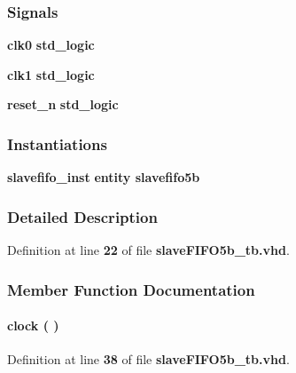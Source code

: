 \subsubsection*{Signals}
 \begin{DoxyCompactItemize}
\item 
{\bf clk0} {\bfseries \textcolor{comment}{std\+\_\+logic}\textcolor{vhdlchar}{ }} 
\item 
{\bf clk1} {\bfseries \textcolor{comment}{std\+\_\+logic}\textcolor{vhdlchar}{ }} 
\item 
{\bf reset\+\_\+n} {\bfseries \textcolor{comment}{std\+\_\+logic}\textcolor{vhdlchar}{ }} 
\end{DoxyCompactItemize}
\subsubsection*{Instantiations}
 \begin{DoxyCompactItemize}
\item 
{\bf slavefifo\+\_\+inst}  {\bfseries entity slavefifo5b}   
\end{DoxyCompactItemize}


\subsubsection{Detailed Description}


Definition at line {\bf 22} of file {\bf slave\+F\+I\+F\+O5b\+\_\+tb.\+vhd}.



\subsubsection{Member Function Documentation}
\paragraph[{clock}]{\setlength{\rightskip}{0pt plus 5cm} {\bfseries \textcolor{vhdlchar}{ }} clock ( ) \hspace{0.3cm}{\ttfamily [Process]}}\label{classslaveFIFO5b__tb_1_1tb__behave_af761a67e9d7ce9e23381088b6f2ae893}


Definition at line {\bf 38} of file {\bf slave\+F\+I\+F\+O5b\+\_\+tb.\+vhd}.

